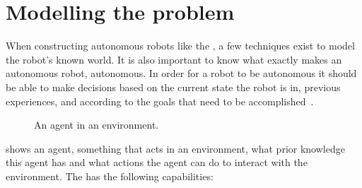 \section{Modelling the problem} \label{sec:model}

When constructing autonomous robots like the \projname{}, a few techniques exist to model the robot's known world. It is also important to know what exactly makes an autonomous robot, autonomous. In order for a robot to be autonomous it should be able to make decisions based on the current state the robot is in, previous experiences, and according to the goals that need to be accomplished~\citep{artificialintelligencebook}. 

\begin{figure}[H]
     \caption{\label{fig:model_mi_agent} An agent in an environment.}
\end{figure}

 shows an agent, something that acts in an environment, what prior knowledge this agent has and what actions the agent can do to interact with the environment. The \projname{} has the following capabilities:


